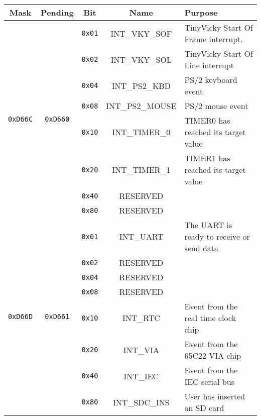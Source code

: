 \begin{table}[ht]
	\begin{center}
		\begin{tabular}{| c | c | c | c | l |} \hline
            Mask & Pending & Bit & Name & Purpose \\ \hline\hline
            \multirow{8}{*}{{\tt 0xD66C}} & \multirow{8}{*}{{\tt 0xD660}} & \verb+0x01+ & INT\_VKY\_SOF & TinyVicky Start Of Frame interrupt. \\ \cline{3-5}
            & & \verb+0x02+ & INT\_VKY\_SOL & TinyVicky Start Of Line interrupt \\ \cline{3-5}
            & & \verb+0x04+ & INT\_PS2\_KBD & PS/2 keyboard event \\ \cline{3-5}
            & & \verb+0x08+ & INT\_PS2\_MOUSE & PS/2 mouse event \\ \cline{3-5}
            & & \verb+0x10+ & INT\_TIMER\_0 & TIMER0 has reached its target value \\ \cline{3-5}
            & & \verb+0x20+ & INT\_TIMER\_1 & TIMER1 has reached its target value \\ \cline{3-5}
            & & \verb+0x40+ & RESERVED & \\ \cline{3-5}
            & & \verb+0x80+ & RESERVED & \\ \hline

            \multirow{8}{*}{{\tt 0xD66D}} & \multirow{8}{*}{{\tt 0xD661}} & \verb+0x01+ & INT\_UART & The UART is ready to receive or send data \\ \cline{3-5}
            & & \verb+0x02+ & RESERVED & \\ \cline{3-5}
            & & \verb+0x04+ & RESERVED & \\ \cline{3-5}
            & & \verb+0x08+ & RESERVED & \\ \cline{3-5}
            & & \verb+0x10+ & INT\_RTC & Event from the real time clock chip \\ \cline{3-5}
            & & \verb+0x20+ & INT\_VIA & Event from the 65C22 VIA chip \\ \cline{3-5}
            & & \verb+0x40+ & INT\_IEC & Event from the IEC serial bus \\ \cline{3-5}
            & & \verb+0x80+ & INT\_SDC\_INS & User has inserted an SD card \\ \hline


\end{tabular}
\end{center}
\end{table}
